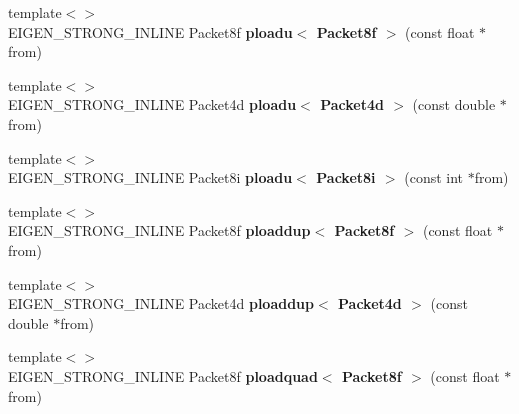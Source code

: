 \begin{DoxyCompactItemize}
\item 
\mbox{\label{namespace_eigen_1_1internal_a7258035635059b76010eefda134045a3}} 
{\footnotesize template$<$$>$ }\\E\+I\+G\+E\+N\+\_\+\+S\+T\+R\+O\+N\+G\+\_\+\+I\+N\+L\+I\+NE Packet8f {\bfseries ploadu$<$ Packet8f $>$} (const float $\ast$from)
\item 
\mbox{\label{namespace_eigen_1_1internal_a84f52d45928544c60749e8f83555266a}} 
{\footnotesize template$<$$>$ }\\E\+I\+G\+E\+N\+\_\+\+S\+T\+R\+O\+N\+G\+\_\+\+I\+N\+L\+I\+NE Packet4d {\bfseries ploadu$<$ Packet4d $>$} (const double $\ast$from)
\item 
\mbox{\label{namespace_eigen_1_1internal_a016af1763070949f8c9e9fe2753335db}} 
{\footnotesize template$<$$>$ }\\E\+I\+G\+E\+N\+\_\+\+S\+T\+R\+O\+N\+G\+\_\+\+I\+N\+L\+I\+NE Packet8i {\bfseries ploadu$<$ Packet8i $>$} (const int $\ast$from)
\item 
\mbox{\label{namespace_eigen_1_1internal_a6d3dfb4dad5f9183f8ee49a28cb1c50d}} 
{\footnotesize template$<$$>$ }\\E\+I\+G\+E\+N\+\_\+\+S\+T\+R\+O\+N\+G\+\_\+\+I\+N\+L\+I\+NE Packet8f {\bfseries ploaddup$<$ Packet8f $>$} (const float $\ast$from)
\item 
\mbox{\label{namespace_eigen_1_1internal_a8e3fd467bb22af29dfb912db2e2d799e}} 
{\footnotesize template$<$$>$ }\\E\+I\+G\+E\+N\+\_\+\+S\+T\+R\+O\+N\+G\+\_\+\+I\+N\+L\+I\+NE Packet4d {\bfseries ploaddup$<$ Packet4d $>$} (const double $\ast$from)
\item 
\mbox{\label{namespace_eigen_1_1internal_a87ac6079d379392919a8d2916d9400ae}} 
{\footnotesize template$<$$>$ }\\E\+I\+G\+E\+N\+\_\+\+S\+T\+R\+O\+N\+G\+\_\+\+I\+N\+L\+I\+NE Packet8f {\bfseries ploadquad$<$ Packet8f $>$} (const float $\ast$from)
\item 
\mbox{\label{namespace_eigen_1_1internal_a4070c26309269f0388e48e45dff4413a}} 

\end{DoxyCompactItemize}
